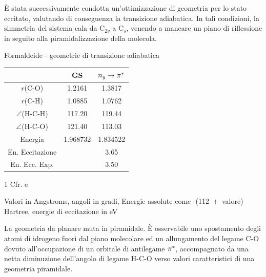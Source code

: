\`E stata successivamente condotta un'ottimizzazione di geometria per lo
stato eccitato, valutando di conseguenza la transizione adiabatica. In tali
condizioni, la simmetria del sistema cala da C$_{2v}$ a C$_s$, venendo a
mancare un piano di riflessione in seguito alla piramidalizzazione della
molecola.

\begin{center}
\begin{threeparttable}
\caption{\small Formaldeide - geometrie di transizione adiabatica}
\label{tab:formaldeide_geometrie_adiab}
\begin{tabular}{|c|cc|}
\hline
					& GS		& $n_y \rightarrow \pi^{*}$ \\ %
\hline
$r$(C-O)		 	& 1.2161	&  1.3817 				\\ %
$r$(C-H)			& 1.0885	&  1.0762					\\ %
$\angle$(H-C-H)		& 117.20	&  119.44					\\ %
$\angle$(H-C-O)		& 121.40	&  113.03					\\ %
Energia 			& 1.968732	&  1.834522					\\ %
En. Eccitazione 	& 			&  3.65						\\ %
En. Ecc. Exp.\tnote{1} & 	&  3.50						\\ %
\hline
\end{tabular}
\begin{tablenotes}
\small
 \item[1] Cfr. \cite{sa-34a-1978-749} e \cite{jpc-97-17-1993-4293}
 \item[] Valori in Angstroms, angoli in gradi, Energie assolute come
  \mbox{-(112 + valore)} Hartree, energie di eccitazione in eV
\end{tablenotes}
\end{threeparttable}
\end{center}

La geometria da planare muta in piramidale. \`E osservabile uno spostamento
degli atomi di idrogeno fuori dal piano molecolare ed un allungamento del
legame C-O dovuto all'occupazione di un orbitale di antilegame $\pi^{*}$,
accompagnato da una netta diminuzione dell'angolo di legame H-C-O verso
valori caratteristici di una geometria piramidale.

